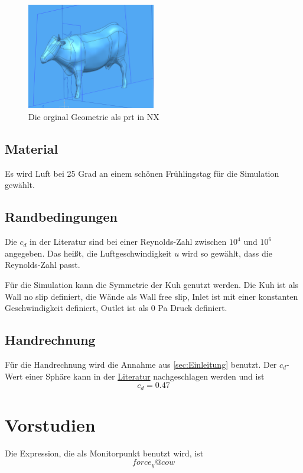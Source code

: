 \documentclass[a4paper,12pt]{article}
\begin{document}
\begin{figure}[h]
    \centering
    \includegraphics[width=0.5\textwidth]{nx.PNG}
    \caption{Die orginal Geometrie als prt in NX}
    \label{fig:nx}
\end{figure}

\subsection{Material}
Es wird Luft bei 25 Grad an einem schönen Frühlingstag für die Simulation gewählt.

\subsection{Randbedingungen}
Die \( c_d \) in der Literatur sind bei einer Reynolds-Zahl zwischen \( 10^4 \) und \( 10^6 \) angegeben. Das heißt, die Luftgeschwindigkeit \( u \) wird so gewählt, dass die Reynolds-Zahl passt.

Für die Simulation kann die Symmetrie der Kuh genutzt werden. Die Kuh ist als Wall no slip definiert, die Wände als Wall free slip, Inlet ist mit einer konstanten Geschwindigkeit definiert, Outlet ist als 0 Pa Druck definiert. 

\subsection{Handrechnung}\label{sec:handrechnung}
Für die Handrechnung wird die Annahme aus \ref{sec:Einleitung} benutzt. Der \( c_d \)-Wert einer Sphäre kann in der \href{https://en.wikipedia.org/wiki/Drag_coefficient}{Literatur} nachgeschlagen werden und ist
$$c_d = 0.47$$


\section{Vorstudien}

Die Expression, die als Monitorpunkt benutzt wird, ist
$$ force_y@cow$$
\end{document}
